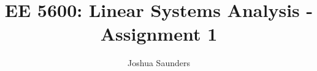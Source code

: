 \documentclass[12pt]{article}
\begin{document}

\title{EE 5600: Linear Systems Analysis - Assignment 1}%
\author{Joshua Saunders\\ %
} %

\maketitle



 \newpage
 \newpage
 \newpage
 \newpage
 \newpage
 \newpage


\newpage



\end{document}
